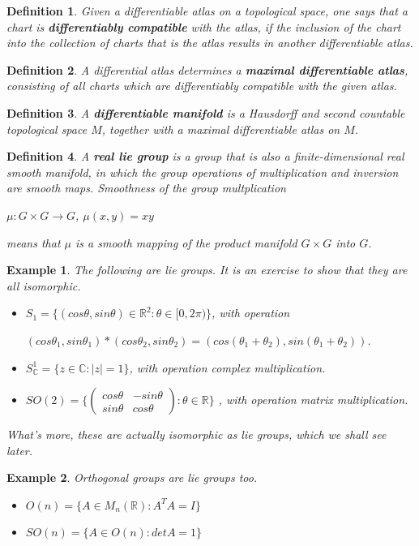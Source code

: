 \documentclass[12pt]{article}
\newcommand{\cx}{\mathbb{C}}
\newcommand{\real}{\mathbb{R}}
\newcommand{\abs}[1]{|#1|}
\newcommand\set[1]{\{#1\}}
\newtheorem{defn}{Definition}[thm]
\newtheorem{example}{Example}[thm]
\begin{document}
\begin{defn}
  Given a differentiable atlas on a topological  space, one says that a chart is \textbf{differentiably compatible} with the atlas, if the  inclusion of the chart into the collection of charts that is the atlas results in another differentiable atlas.
\end{defn}

\begin{defn}
  A differential atlas determines a \textbf{maximal differentiable atlas}, consisting of all charts which are differentiably compatible with the given atlas.
\end{defn}

\begin{defn}
  A \textbf{differentiable manifold} is a Hausdorff and  second countable topological space  $M$, together  with a maximal differentiable  atlas on $M$.
\end{defn}

\begin{defn}
  A \textbf{real lie group} is a group that is also a finite-dimensional real smooth manifold, in which the group operations of multiplication and inversion are smooth maps. Smoothness of the group multplication
\begin{center}
  $\mu : G \times G \to G$,  $\mu(x,y)=xy$
\end{center}
  means that $\mu$ is a smooth mapping of the product manifold $G \times G$ into $G$.
\end{defn}

\begin{example}
  The following are lie groups. It is an exercise to show that they are all isomorphic.
\begin{itemize}
\item
  $S_1 = \set{(cos \theta, sin \theta) \in \real^2 : \theta \in [0,2\pi)}$, with operation
  \begin{center}
    $(cos \theta_1, sin \theta_1) * (cos \theta_2, sin \theta_2) = (cos (\theta_1 + \theta_2), sin (\theta_1 + \theta_2))$.
  \end{center}
 
\item
    $S_{\cx}^1 = \set{z \in \cx : \abs{z} = 1}$, with operation complex multiplication.

\item
    $SO(2) = \set{ \begin{pmatrix}
      cos \theta & - sin \theta\\
      sin \theta & cos \theta 
    \end{pmatrix} : \theta \in \real}$
  , with operation matrix multiplication.
\end{itemize}
What's more, these are actually isomorphic as lie groups, which we shall see later. 
\end{example}

\begin{example}
  Orthogonal groups are lie groups too.
  \begin{itemize}
  \item
    $O(n) = \set{A \in M_n(\real) : A^TA = I}$
  \item
    $SO(n) = \set{A \in O(n) : det A = 1}$
  \end{itemize}
\end{example}
\end{document}
